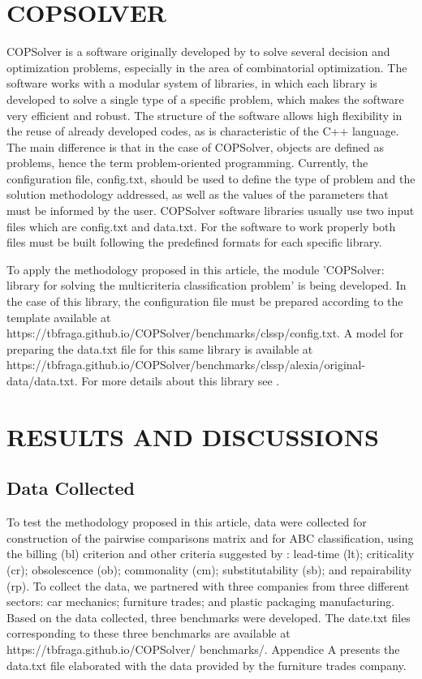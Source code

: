\documentclass[10pt,fleqn,a4paper,twoside]{article}
\begin{document}
	\section{COPSOLVER}
	
	COPSolver is a software originally developed by \cite{Fraga2023} to solve several decision and optimization problems, especially in the area of combinatorial optimization. The software works with a modular system of libraries, in which each library is developed to solve a single type of a specific problem, which makes the software very efficient and robust. The structure of the software allows high flexibility in the reuse of already developed codes, as is characteristic of the C++ language. The main difference is that in the case of COPSolver, objects are defined as problems, hence the term problem-oriented programming. Currently, the configuration file, config.txt, should be used to define the type of problem and the solution methodology addressed, as well as the values of the parameters that must be informed by the user. COPSolver software libraries usually use two input files which are config.txt and data.txt. For the software to work properly both files must be built following the predefined formats for each specific library.  
	
	To apply the methodology proposed in this article, the module 'COPSolver: library for solving the multicriteria classification problem' is being developed. In the case of this library, the configuration file must be prepared according to the template available at https://tbfraga.github.io/COPSolver/benchmarks/clssp/config.txt. A model for preparing the data.txt file for this same library is available at https://tbfraga.github.io/COPSolver/benchmarks/clssp/alexia/original-data/data.txt. For more details about this library see \cite{Fraga2024}.
	
	\section{RESULTS AND DISCUSSIONS}
    
    \subsection{Data Collected}
    
    To test the methodology proposed in this article, data were collected for construction of the pairwise comparisons matrix and for ABC classification, using the billing (bl) criterion and other criteria suggested by \cite{FloresWhybark1986}: lead-time (lt); criticality (cr); obsolescence (ob); commonality (cm); substitutability (sb); and repairability (rp). To collect the data, we partnered with three companies from three different sectors: car mechanics; furniture trades; and plastic packaging manufacturing. Based on the data collected, three benchmarks were developed. The date.txt files corresponding to these three benchmarks are available at https://tbfraga.github.io/COPSolver/ benchmarks/. Appendice A presents the data.txt file elaborated with the data provided by the furniture trades company.
    
\end{document}
